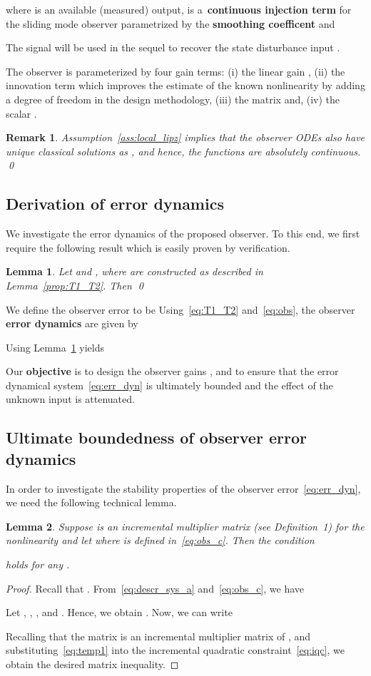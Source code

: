 \documentclass[times, doublespace]{rncauth}
\newtheorem{lemma}{Lemma}
\newtheorem{remark}{Remark}
\begin{document}
where  is an available (measured) output,  is a~\textbf{continuous injection term} for the sliding mode observer parametrized by the \textbf{smoothing coefficent}  and 

The signal  will be used in the sequel to recover the state disturbance input . 


The observer is parameterized by four gain terms: (i) the linear gain , (ii) the innovation term  which improves the estimate of the known nonlinearity  by adding a degree of freedom in the design methodology, (iii) the matrix  and, (iv) the scalar . 
\begin{remark}\label{rk:abs_cont_e}
	Assumption~\ref{ass:local_lipz} implies that the observer ODEs also have unique classical solutions as , and hence, the functions  are absolutely continuous.
\qed	\end{remark}
\subsection{Derivation of error dynamics}
We investigate the error dynamics of the proposed observer. To this end, we first require the following result which is easily proven by verification.
\begin{lemma}\label{prop:Q_zero}
	Let  and , where  are constructed as described in Lemma~\ref{prop:T1_T2}. Then \qed
\end{lemma}

We define the observer error to be  Using~\eqref{eq:T1_T2} and~\eqref{eq:obs}, the observer \textbf{error dynamics} are given by

Using Lemma~\ref{prop:Q_zero} yields

Our \textbf{objective} is to design the observer gains ,  and  to ensure that the error dynamical system~\eqref{eq:err_dyn} is ultimately bounded and the effect of the unknown input  is attenuated.

\subsection{Ultimate boundedness of observer error dynamics}
In order to investigate the stability properties of the observer error~\eqref{eq:err_dyn}, we need the following technical lemma.
\begin{lemma}\label{lem:1}
	Suppose  is an incremental multiplier matrix (see Definition~1) for the nonlinearity  and let  where  is defined in~\eqref{eq:obs_c}. Then the condition
	
	holds for any .
\end{lemma}
\begin{proof}
	Recall that . From~\eqref{eq:descr_sys_a} and~\eqref{eq:obs_c}, we have 
	
	Let , , , and . 
	Hence, we obtain .
	Now, we can write
	
	Recalling that the matrix  is an incremental multiplier matrix of , and substituting~\eqref{eq:temp1} into the incremental quadratic constraint~\eqref{eq:iqc}, we obtain the desired matrix inequality.
\end{proof}
\end{document}
